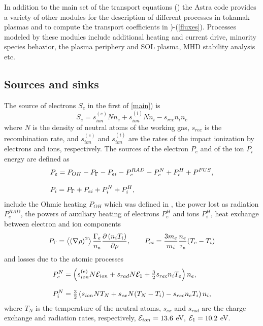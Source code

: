 In addition to the main set of the transport equations () the
Astra code provides a variety of other modules for the description of
different processes in tokamak plasmas and to compute the transport
coefficients in \eqs{\ref{main}})-(\ref{fluxes}).
Processes modeled by these modules include additional heating and
current drive, minority species behavior, the plasma periphery and SOL
plasma, MHD stability analysis etc.

\subsection{Sources and sinks}

The source of electrons $S_e$ in the first of \eqs\ref{main}) is 
\begin{equation}\label{S}
S_e=s_{ion}^{(e)}Nn_e+s_{ion}^{(i)}Nn_i-s_{rec}n_in_e
\end{equation}
where $N$ is the density of neutral atoms of the working gas, $s_{rec}$
is the recombination rate, and $s_{ion}^{(e)}$ and $s_{ion}^{(i)}$ are
the rates of the impact ionization by electrons and ions, respectively. 
The sources of the electron $P_e$ and of the ion $P_i$ energy are
defined as
\begin{equation}
\begin{array}{l}\label{P}\dstyle
P_e
=P_{OH}-P_{\Gamma}-P_{ei}-P_e^{RAD}-P_e^N+P_e^H+P^{FUS}
,\bigskip\\ \dstyle
P_i=P_{\Gamma}+P_{ei}+P_i^N+P_i^H
,\end{array}
\end{equation}
include the Ohmic heating $P_{OH}$ which was defined in , the
power lost as radiation $P_e^{RAD}$, the powers of auxiliary heating
of electrons $P_e^H$ and ions $P_i^H$, heat exchange between electron
and ion components 
\begin{equation}\label{Pei}\displaystyle
P_{\Gamma}
=\left<(\nabla\rho)^2\right>\frac{\Gamma_e}{n_e}\displaystyle{\partial \left(n_iT_i\right)\over\partial \rho}
,\qquad
P_{ei}=\frac{3m_e}{m_i}\frac{n_e}{\tau_e}(T_e-T_i)
\end{equation}
and losses due to the atomic processes
\begin{equation}
\begin{array}{l}\label{PN}\dstyle
P_e^N
=\left(s_{ion}^{(e)}N{\cal E}_{ion}+s_{rad}N{\cal E}_1
+\tstyle\frac{3}{2}s_{rec}n_iT_e\right)n_e
,\bigskip\\ \dstyle
P_i^N
=\tstyle\frac{3}{2}\left(s_{ion}NT_N+s_{cx}N(T_N-T_i)
-s_{rec}n_eT_i\right)n_i
,\end{array}
\end{equation}
where $T_N$ is the temperature of the neutral atoms, $s_{cx}$ and
$s_{rad}$ are  the charge exchange and radiation rates, respectively,
${\cal E}_{ion}=13.6$ eV, ${\cal E}_1=10.2$ eV. 

